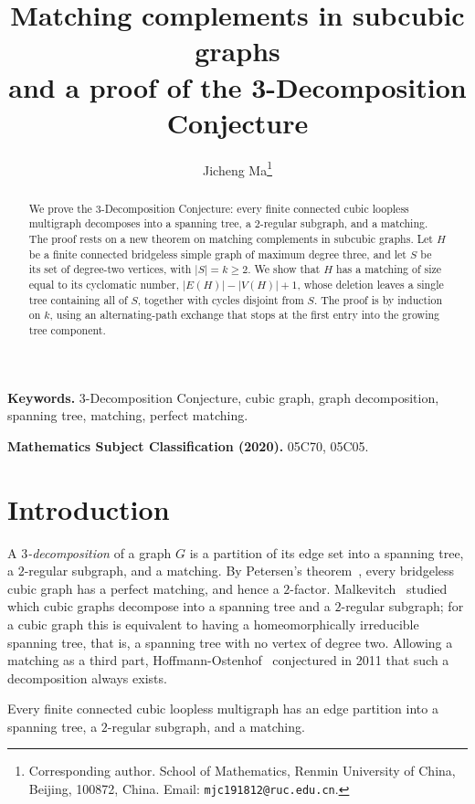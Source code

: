 \documentclass[a4paper,11pt]{article}
\title{Matching complements in subcubic graphs\\[2pt]
        and a proof of the 3-Decomposition Conjecture}
\author{Jicheng Ma\thanks{Corresponding author. School of Mathematics, Renmin
University of China, Beijing, 100872, China. Email:
\texttt{mjc191812@ruc.edu.cn}.}}
\date{}
\newcommand{\abs}[1]{\left\lvert#1\right\rvert}
\numberwithin{equation}{section}
\begin{document}
\maketitle

\begin{abstract}
We prove the $3$-Decomposition Conjecture: every finite connected cubic
loopless multigraph decomposes into a spanning tree, a $2$-regular subgraph, and
a matching. The proof rests on a new theorem on matching complements in
subcubic graphs. Let $H$ be a finite connected bridgeless simple graph of
maximum degree three, and let $S$ be its set of degree-two vertices, with
$\abs{S}=k\ge 2$. We show that $H$ has a matching of size equal to its
cyclomatic number, $\abs{E(H)}-\abs{V(H)}+1$, whose deletion leaves a single
tree containing all of $S$, together with cycles disjoint from $S$. The proof is
by induction on $k$, using an alternating-path exchange that stops at the first
entry into the growing tree component.

\end{abstract}

\noindent\textbf{Keywords.} 3-Decomposition Conjecture, cubic graph, graph
decomposition, spanning tree, matching, perfect matching.

\smallskip

\noindent\textbf{Mathematics Subject Classification (2020).} 05C70, 05C05.

\bigskip

\section{Introduction}\label{sec:intro}

A \emph{$3$-decomposition} of a graph $G$ is a partition of its edge set into a
spanning tree, a $2$-regular subgraph, and a matching. By Petersen's
theorem~\cite{Petersen1891}, every bridgeless cubic graph has a perfect matching,
and hence a $2$-factor. Malkevitch~\cite{Malkevitch1979} studied which cubic
graphs decompose into a spanning tree and a $2$-regular subgraph; for a cubic
graph this is equivalent to having a homeomorphically irreducible spanning tree,
that is, a spanning tree with no vertex of degree two. Allowing a matching as a
third part, Hoffmann-Ostenhof~\cite{HoffmannOstenhof2011} conjectured in 2011
that such a decomposition always exists.

\begin{conjecture}\label{conj:3dc}
  Every finite connected cubic loopless multigraph has an edge partition into a
  spanning tree, a $2$-regular subgraph, and a matching.
\end{conjecture}
\end{document}
